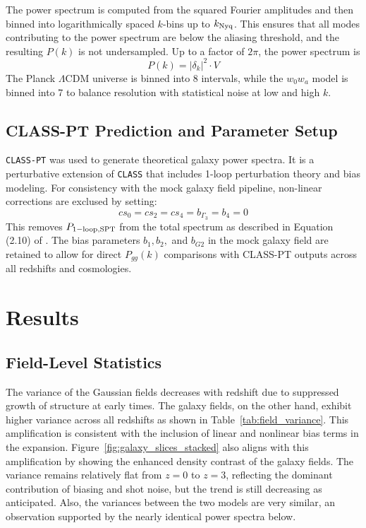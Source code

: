 \documentclass[trackchanges]{aastex7}
\begin{document}
The power spectrum is computed from the squared Fourier amplitudes and then binned into logarithmically spaced \( k \)-bins up to \( k_{\rm Nyq} \). 
This ensures that all modes contributing to the power spectrum are below the aliasing threshold, and the resulting \( P(k) \) is not undersampled.
Up to a factor of $2\pi$, the power spectrum is
\begin{equation}
P(k) = |\delta_k|^2 \cdot V
\end{equation}
The Planck $\Lambda$CDM universe is binned into 8 intervals, while the $w_0 w_a$ model is binned into 7 to balance resolution with statistical noise at low and high $k$.

\subsection{CLASS-PT Prediction and Parameter Setup}

\texttt{CLASS-PT} \citep{CLASSPT2020} was used to generate theoretical galaxy power spectra. It is a perturbative extension of \texttt{CLASS} that includes 1-loop perturbation theory and bias modeling. 
For consistency with the mock galaxy field pipeline, non-linear corrections are exclused by setting:
\begin{equation}
cs_0 = cs_2 = cs_4 = b_{\Gamma_3} = b_4 = 0
\end{equation}
This removes $P_{\rm 1-loop, SPT}$ from the total spectrum as described in Equation (2.10) of \citet{CLASSPT2020}. 
The bias parameters $b_1, b_2,$ and $b_{G2}$ in the mock galaxy field are retained to allow for direct $P_{gg}(k)$ comparisons with CLASS-PT outputs across all redshifts and cosmologies.

\section{Results} \label{sec:results}

\subsection{Field-Level Statistics}

The variance of the Gaussian fields decreases with redshift due to suppressed growth of structure at early times.
The galaxy fields, on the other hand, exhibit higher variance across all redshifts as shown in Table~\ref{tab:field_variance}. 
This amplification is consistent with the inclusion of linear and nonlinear bias terms in the expansion. 
Figure~\ref{fig:galaxy_slices_stacked} also aligns with this amplification by showing the enhanced density contrast of the galaxy fields.
The variance remains relatively flat from $z = 0$ to $z = 3$, reflecting the dominant contribution of biasing and shot noise, but the trend is still decreasing as anticipated.
Also, the variances between the two models are very similar, an observation supported by the nearly identical power spectra below. 
\end{document}
